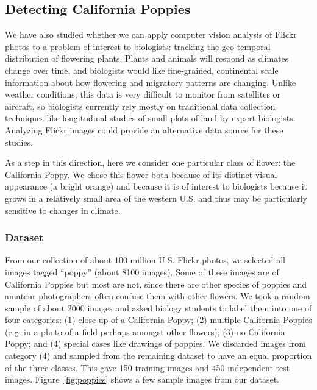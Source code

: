 \subsection{Detecting California Poppies}

We have also studied whether we can apply computer
vision analysis of Flickr photos to a problem of interest to
biologists: tracking the geo-temporal distribution of flowering
plants.  Plants and animals will respond as climates change over time,
and biologists would like fine-grained, continental scale information
about how flowering and migratory patterns are changing. Unlike
weather conditions, this data is very difficult to monitor from
satellites or aircraft, so biologists currently rely mostly on
traditional data collection techniques like longitudinal studies of
small plots of land by expert biologists. Analyzing Flickr images
could provide an alternative data source for these studies.

As a step in this direction, here we consider one particular
class of flower: the California Poppy. We chose this flower both because of its
distinct visual appearance (a bright orange) and because it is of
interest to biologists because it grows in a relatively
small area of the western U.S. and thus may be particularly
sensitive to changes in climate.

\subsubsection*{Dataset}

From our collection of about 100 million U.S. Flickr photos, we selected
all images tagged ``poppy'' (about  8100 images). Some
of these images are of  California Poppies but most are not, since
there are other species of poppies and amateur photographers often
confuse them with other flowers. We took a random sample of about 2000
images and asked biology  students to label them into one of
four categories: (1) close-up of a California Poppy; (2) multiple
California Poppies (e.g. in a photo of a field perhaps amongst other
flowers); (3) no California Poppy; and (4) special
cases like drawings of poppies.  We discarded images from category (4) and
sampled from the remaining dataset to have an equal proportion of the 
three classes. This gave 150 training images and 450 independent test images.
Figure~\ref{fig:poppies} shows a few sample images from our dataset.

